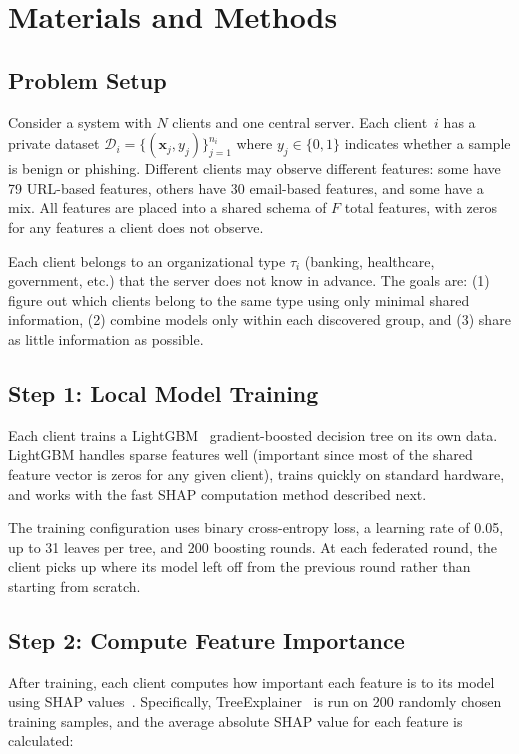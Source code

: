 \documentclass[information,article,submit,pdftex]{mdpi}
\begin{document}
\section{Materials and Methods}\label{sec:methods}

\subsection{Problem Setup}

Consider a system with $N$ clients and one central server. Each client~$i$ has a
private dataset $\mathcal{D}_i = \{(\mathbf{x}_j, y_j)\}_{j=1}^{n_i}$ where
$y_j \in \{0,1\}$ indicates whether a sample is benign or phishing. Different
clients may observe different features: some have 79 URL-based features, others
have 30 email-based features, and some have a mix. All features are placed into a
shared schema of $F$ total features, with zeros for any features a client does
not observe.

Each client belongs to an organizational type $\tau_i$ (banking, healthcare,
government, etc.) that the server does not know in advance. The goals are: (1)
figure out which clients belong to the same type using only minimal shared
information, (2) combine models only within each discovered group, and (3) share
as little information as possible.

\subsection{Step 1: Local Model Training}

Each client trains a LightGBM~\cite{ke2017lightgbm} gradient-boosted decision
tree on its own data. LightGBM handles sparse features well (important since most
of the shared feature vector is zeros for any given client), trains quickly on
standard hardware, and works with the fast SHAP computation method described next.

The training configuration uses binary cross-entropy loss, a learning rate of
0.05, up to 31 leaves per tree, and 200 boosting rounds. At each federated round,
the client picks up where its model left off from the previous round rather than
starting from scratch.

\subsection{Step 2: Compute Feature Importance}

After training, each client computes how important each feature is to its model
using SHAP values~\cite{lundberg2017shap}. Specifically,
TreeExplainer~\cite{lundberg2020treeshap} is run on 200 randomly chosen training
samples, and the average absolute SHAP value for each feature is calculated:
\end{document}
